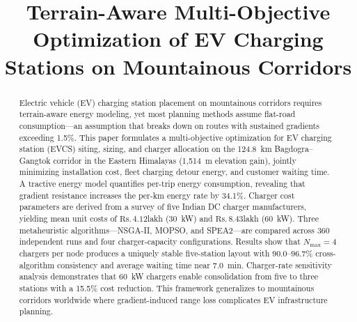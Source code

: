 \documentclass[conference]{IEEEtran}
\newcommand{\Rs}[1]{\ensuremath{\mathrm{Rs}{.}\,#1}}
\begin{document}
\title{Terrain-Aware Multi-Objective Optimization of EV Charging Stations on Mountainous Corridors}

\author{
\and
{}
}

\maketitle

\begin{abstract}
Electric vehicle (EV) charging station placement on mountainous corridors requires terrain-aware energy modeling, yet most planning methods assume flat-road consumption---an assumption that breaks down on routes with sustained gradients exceeding 1.5\%. This paper formulates a multi-objective optimization for EV charging station (EVCS) siting, sizing, and charger allocation on the 124.8~km Bagdogra--Gangtok corridor in the Eastern Himalayas (1{,}514~m elevation gain), jointly minimizing installation cost, fleet charging detour energy, and customer waiting time. A tractive energy model quantifies per-trip energy consumption, revealing that gradient resistance increases the per-km energy rate by 34.1\%. Charger cost parameters are derived from a survey of five Indian DC charger manufacturers, yielding mean unit costs of \Rs{4.12}{lakh} (30~kW) and \Rs{8.43}{lakh} (60~kW). Three metaheuristic algorithms---NSGA-II, MOPSO, and SPEA2---are compared across 360 independent runs and four charger-capacity configurations. Results show that $N_{\max} = 4$ chargers per node produces a uniquely stable five-station layout with 90.0--96.7\% cross-algorithm consistency and average waiting time near 7.0~min. Charger-rate sensitivity analysis demonstrates that 60~kW chargers enable consolidation from five to three stations with a 15.5\% cost reduction. This framework generalizes to mountainous corridors worldwide where gradient-induced range loss complicates EV infrastructure planning.
\end{abstract}
\end{document}
